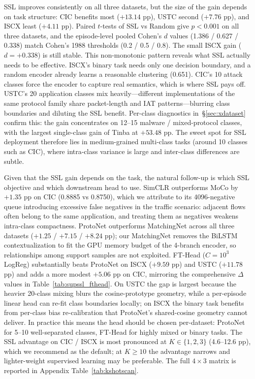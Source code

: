 \documentclass[sensors,article,submit,moreauthors]{Definitions/mdpi}
\begin{document}
SSL improves consistently on all three datasets, but the size of the gain depends on task structure: CIC benefits most ($+13.14$ pp), USTC second ($+7.76$ pp), and ISCX least ($+4.11$ pp). Paired $t$-tests of SSL vs Random give $p < 0.001$ on all three datasets, and the episode-level pooled Cohen's $d$ values (1.386 / 0.627 / 0.338) match Cohen's 1988 thresholds (0.2 / 0.5 / 0.8). The small ISCX gain ($d = +0.338$) is still stable. This non-monotonic pattern reveals what SSL actually needs to be effective. ISCX's binary task needs only one decision boundary, and a random encoder already learns a reasonable clustering (0.651). CIC's 10 attack classes force the encoder to capture real semantics, which is where SSL pays off. USTC's 20 application classes mix heavily---different implementations of the same protocol family share packet-length and IAT patterns---blurring class boundaries and diluting the SSL benefit. Per-class diagnostics in~\S\ref{sec:xdataset} confirm this: the gain concentrates on 12--15 malware / mixed-protocol classes, with the largest single-class gain of Tinba at $+53.48$ pp. The sweet spot for SSL deployment therefore lies in medium-grained multi-class tasks (around 10 classes such as CIC), where intra-class variance is large and inter-class differences are subtle.

Given that the SSL gain depends on the task, the natural follow-up is which SSL objective and which downstream head to use. SimCLR outperforms MoCo by $+1.35$ pp on CIC (0.8885 vs 0.8750), which we attribute to its 4096-negative queue introducing excessive false negatives in the traffic scenario: adjacent flows often belong to the same application, and treating them as negatives weakens intra-class compactness. ProtoNet outperforms MatchingNet across all three datasets ($+1.25$ / $+7.15$ / $+8.24$ pp); our MatchingNet removes the BiLSTM contextualization to fit the GPU memory budget of the 4-branch encoder, so relationships among support samples are not exploited. FT-Head ($C = 10^3$ LogReg) substantially beats ProtoNet on ISCX ($+9.59$ pp) and USTC ($+11.78$ pp) and adds a more modest $+5.06$ pp on CIC, mirroring the comprehensive $\Delta$ values in Table~\ref{tab:supssl_fthead}. On USTC the gap is largest because the heavier 20-class mixing blurs the cosine-prototype geometry, while a per-episode linear head can re-fit class boundaries locally; on ISCX the binary task benefits from per-class bias re-calibration that ProtoNet's shared-cosine geometry cannot deliver. In practice this means the head should be chosen per-dataset: ProtoNet for 5--10 well-separated classes, FT-Head for highly mixed or binary tasks. The SSL advantage on CIC / ISCX is most pronounced at $K \in \{1, 2, 3\}$ (4.6--12.6 pp), which we recommend as the default; at $K \geq 10$ the advantage narrows and lighter-weight supervised learning may be preferable. The full $4 \times 3$ matrix is reported in Appendix Table~\ref{tab:kshotscan}.
\end{document}
